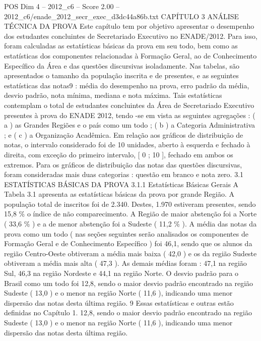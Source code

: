 \begin{textsample}{POS Dim 4 – 2012\_c6 – Score 2.00 – 2012\_c6/enade\_2012\_secr\_exec\_d3dc44a86b.txt}  \label{ex:f4_pos_124}
CAPÍTULO 3 ANÁLISE TÉCNICA DA PROVA Este capítulo tem por objetivo apresentar o desempenho dos estudantes concluintes de Secretariado Executivo no ENADE/2012.
Para isso, foram calculadas as estatísticas básicas da prova em seu todo, bem como as estatísticas dos componentes relacionadas à Formação Geral, ao de Conhecimento Específico da Área e das questões discursivas isoladamente.
Nas tabelas, são apresentados o tamanho da população inscrita e de presentes, e as seguintes estatísticas das notas9 : média do desempenho na prova, erro padrão da média, desvio padrão, nota mínima, mediana e nota máxima.
Tais estatísticas contemplam o total de estudantes concluintes da Área de Secretariado Executivo presentes à prova do ENADE 2012, tendo -se em vista as seguintes agregações : ( a ) as Grandes Regiões e o país como um todo ; ( b ) a Categoria Administrativa ; e ( c ) a Organização Acadêmica.
Em relação aos gráficos de distribuição de notas, o intervalo considerado foi de 10 unidades, aberto à esquerda e fechado à direita, com exceção do primeiro intervalo, [ 0 ; 10 ], fechado em ambos os extremos.
Para os gráficos de distribuição das notas das questões discursivas, foram consideradas mais duas categorias : questão em branco e nota zero. 3.1 ESTATÍSTICAS BÁSICAS DA PROVA 3.1.1 Estatísticas Básicas Gerais A Tabela 3.1 apresenta as estatísticas básicas da prova por grande Região.
A população total de inscritos foi de 2.340.
Destes, 1.970 estiveram presentes, sendo 15,8 \% o índice de não comparecimento.
A Região de maior abstenção foi a Norte ( 33,6 \% ) e a de menor abstenção foi a Sudeste ( 11,2 \% ).
A média das notas da prova como um todo ( nas seções seguintes serão analisados os componentes de Formação Geral e de Conhecimento Específico ) foi 46,1, sendo que os alunos da região Centro-Oeste obtiveram a média mais baixa ( 42,0 ) e os da região Sudeste obtiveram a média mais alta ( 47,3 ).
As demais médias foram : 47,1 na região Sul, 46,3 na região Nordeste e 44,1 na região Norte.
O desvio padrão para o Brasil como um todo foi 12,8, sendo o maior desvio padrão encontrado na região Sudeste ( 13,0 ) e o menor na região Norte ( 11,6 ), indicando uma menor dispersão das notas desta última região. 9 Essas estatísticas e outras estão definidas no Capítulo 1. 12,8, sendo o maior desvio padrão encontrado na região Sudeste ( 13,0 ) e o menor na região Norte ( 11,6 ), indicando uma menor dispersão das notas desta última região.

\end{textsample}
